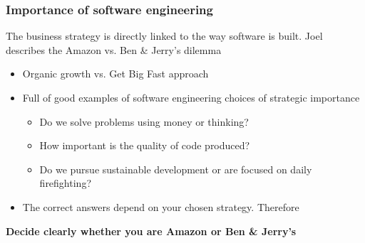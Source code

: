 \begin{frame}[fragile]
  \frametitle{Importance of software engineering}
  The business strategy is directly linked to the way software is built. Joel \citep{spolsky2004joel2} describes the Amazon vs. Ben \& Jerry's dilemma
  \begin{itemize}
  	\item Organic growth vs. Get Big Fast approach 
	\item Full of good examples of software engineering choices of strategic importance
		  \begin{itemize}
		  	\item Do we solve problems using money or thinking?
			\item How important is the quality of code produced?
			\item Do we pursue sustainable development or are focused on daily firefighting?
		  \end{itemize}
	\item The correct answers depend on your chosen strategy. Therefore
  \end{itemize}
  \begin{center}
	  \textbf{Decide clearly whether you are Amazon or Ben \& Jerry's}
  \end{center}
\end{frame}

